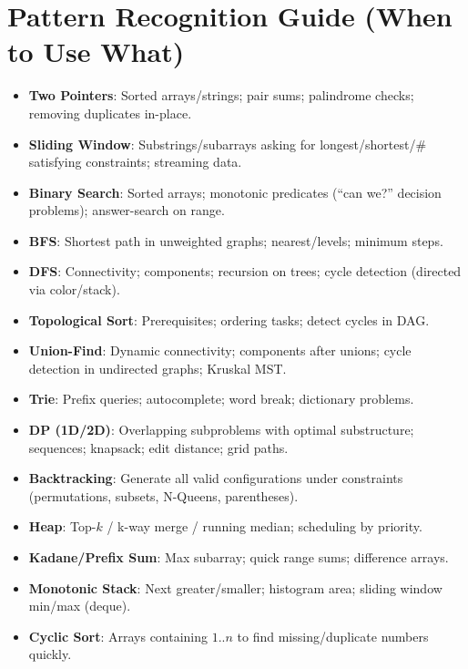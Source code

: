\documentclass[11pt]{article}
\begin{document}
\section{Pattern Recognition Guide (When to Use What)}
\begin{itemize}[leftmargin=1.2em]
  \item \textbf{Two Pointers}: Sorted arrays/strings; pair sums; palindrome checks; removing duplicates in-place.
  \item \textbf{Sliding Window}: Substrings/subarrays asking for longest/shortest/\# satisfying constraints; streaming data.
  \item \textbf{Binary Search}: Sorted arrays; monotonic predicates (``can we?'' decision problems); answer-search on range.
  \item \textbf{BFS}: Shortest path in unweighted graphs; nearest/levels; minimum steps.
  \item \textbf{DFS}: Connectivity; components; recursion on trees; cycle detection (directed via color/stack).
  \item \textbf{Topological Sort}: Prerequisites; ordering tasks; detect cycles in DAG.
  \item \textbf{Union-Find}: Dynamic connectivity; components after unions; cycle detection in undirected graphs; Kruskal MST.
  \item \textbf{Trie}: Prefix queries; autocomplete; word break; dictionary problems.
  \item \textbf{DP (1D/2D)}: Overlapping subproblems with optimal substructure; sequences; knapsack; edit distance; grid paths.
  \item \textbf{Backtracking}: Generate all valid configurations under constraints (permutations, subsets, N-Queens, parentheses).
  \item \textbf{Heap}: Top-$k$ / k-way merge / running median; scheduling by priority.
  \item \textbf{Kadane/Prefix Sum}: Max subarray; quick range sums; difference arrays.
  \item \textbf{Monotonic Stack}: Next greater/smaller; histogram area; sliding window min/max (deque).
  \item \textbf{Cyclic Sort}: Arrays containing $1..n$ to find missing/duplicate numbers quickly.
\end{itemize}
\end{document}

